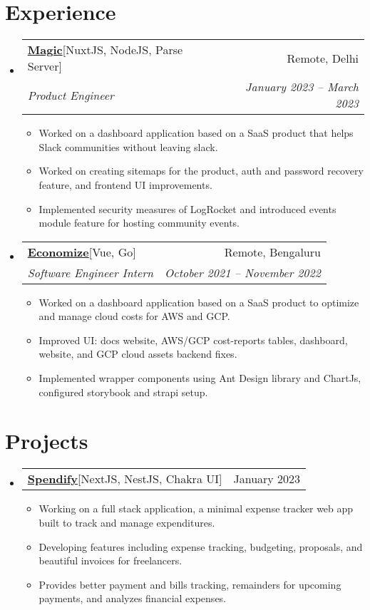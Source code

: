 \documentclass[letterpaper,11pt]{article}
\makeatletter
\newcommand{\resumeItem}[1]{
    \item\small{
      {#1 \vspace{-2pt}}
    }
  }
\newcommand{\resumeSubheading}[4]{
    \vspace{-2pt}\item
      \begin{tabular*}{0.97\textwidth}[t]{l@{\extracolsep{\fill}}r}
        {#1} & #2 \\
        \textit{\small#3} & \textit{\small #4} \\
      \end{tabular*}\vspace{-7pt}
  }
\newcommand{\resumeSubSubheading}[2]{
      \item
      \begin{tabular*}{0.97\textwidth}{l@{\extracolsep{\fill}}r}
        \textit{\small#1} & \textit{\small #2} \\
      \end{tabular*}\vspace{-7pt}
  }
\newcommand{\resumeProjectHeading}[2]{
      \item
      \begin{tabular*}{0.97\textwidth}{l@{\extracolsep{\fill}}r}
        \small#1 & #2 \\
      \end{tabular*}\vspace{-7pt}
  }
\newcommand{\resumeSubHeadingListStart}{\begin{itemize}[leftmargin=0.15in, label={}]}
\newcommand{\resumeSubHeadingListEnd}{\end{itemize}}
\newcommand{\resumeItemListStart}{\begin{itemize}}
\newcommand{\resumeItemListEnd}{\end{itemize}\vspace{-5pt}}
\makeatother
\begin{document}
\section{Experience}
\resumeSubHeadingListStart
\resumeSubheading
{\textbf{\href{https://magic.app}{Magic}\hspace{3pt}}{{[NuxtJS, NodeJS, Parse Server]}}}{Remote, Delhi}
{Product Engineer}{January 2023 -- March 2023}
\resumeItemListStart
\resumeItem{Worked on a dashboard application based on a SaaS product that helps Slack communities without leaving slack. }
\resumeItem{Worked on creating sitemaps for the product, auth and password recovery feature, and frontend UI improvements. }
\resumeItem{Implemented security measures of LogRocket and introduced events module feature for hosting community events.}
\resumeItemListEnd


\resumeSubheading
{\textbf{\href{https://economize.cloud}{Economize}\hspace{3pt}}{{[Vue, Go]}}}{Remote, Bengaluru}
{Software Engineer Intern}{October 2021 -- November 2022}
\resumeItemListStart
\resumeItem{Worked on a dashboard application based on a SaaS product to optimize and manage cloud costs for AWS and GCP.}
\resumeItem{Improved UI: docs website, AWS/GCP cost-reports tables, dashboard, website, and GCP cloud assets backend fixes.}
\resumeItem{Implemented wrapper components using Ant Design library and ChartJs, configured storybook and strapi setup.}
\resumeItemListEnd
\resumeSubHeadingListEnd


\section{Projects}

\resumeSubHeadingListStart
\resumeProjectHeading
{\textbf{\href{https://github.com/spendify-io}{Spendify}\hspace{3pt}}{[NextJS, NestJS, Chakra UI]}}{January 2023}
\resumeItemListStart
\resumeItem{Working on a full stack application, a minimal expense tracker web app built to track and manage expenditures.}
\resumeItem{Developing features including expense tracking, budgeting, proposals, and beautiful invoices for freelancers.}
\resumeItem{Provides better payment and bills tracking, remainders for upcoming payments, and analyzes financial expenses.}
\resumeItemListEnd
\resumeSubHeadingListEnd
\end{document}
